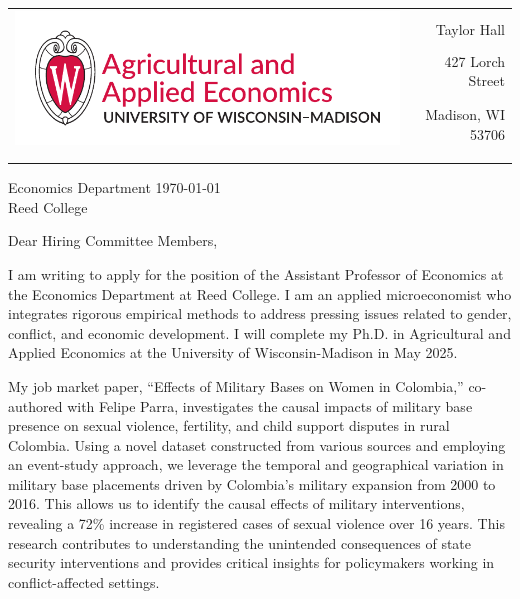 \documentclass[12pt]{letter}
\begin{document}
\begin{tabularx}{\textwidth}{Xr}
\multirow{4}{*}{\includegraphics[height=3\baselineskip]{logo_cropped.pdf}} &  \\
& Taylor Hall \\
& 427 Lorch Street \\
& Madison, WI 53706 \\
[-1.8ex]\\
\\
\end{tabularx}

Economics Department \hfill \today \\
Reed College

\medskip

Dear Hiring Committee Members,

I am writing to apply for the position of the Assistant Professor of Economics 
at the Economics Department at Reed College. 
I am an applied microeconomist who integrates rigorous empirical methods to address pressing issues related to gender, conflict, and economic development.
I will complete my Ph.D. in Agricultural and Applied Economics at the University of Wisconsin-Madison in May 2025. 

My job market paper, “Effects of Military Bases on Women in Colombia,” co-authored with Felipe Parra, investigates the causal impacts of military base presence 
on sexual violence, fertility, and child support disputes in rural Colombia. Using a novel dataset constructed from various sources and employing an event-study approach, 
we leverage the temporal and geographical variation in military base placements driven by Colombia's military expansion from 2000 to 2016. This allows us to identify 
the causal effects of military interventions, revealing a 72\% increase in registered cases of sexual violence over 16 years. 
This research contributes to understanding the unintended consequences of state security interventions and provides critical insights 
for policymakers working in conflict-affected settings.
\end{document}
